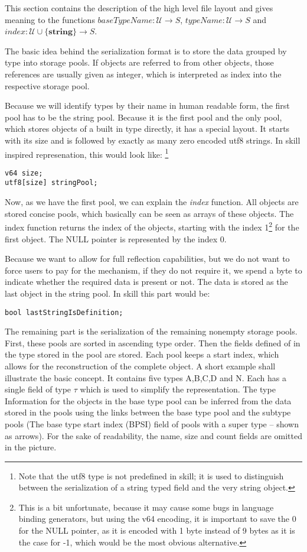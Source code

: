 \documentclass[a4paper,10pt]{article}
\begin{document}
This section contains the description of the high level file layout and gives meaning to the functions $baseTypeName: \mathcal{U} → S$, $typeName: \mathcal{U} → S$ and $index: \mathcal{U}\cup\{\textbf{string}\} → S$.

The basic idea behind the serialization format is to store the data grouped by type into storage pools. If objects are referred to from other objects, those references are usually given as integer, which is interpreted as index into the respective storage pool.

Because we will identify types by their name in human readable form, the first pool has to be the string pool. Because it is the first pool and the only pool, which stores objects of a built in type directly, it has a special layout. It starts with its size and is followed by exactly as many zero encoded utf8 strings. In skill inspired represenation, this would look like: \footnote{Note that the utf8 type is not predefined in skill; it is used to distinguish between the serialization of a string typed field and the very string object.}
\begin{verbatim}
v64 size;
utf8[size] stringPool;
\end{verbatim}

Now, as we have the first pool, we can explain the \textit{index} function. All objects are stored concise pools, which basically can be seen as arrays of these objects. The index function returns the index of the objects, starting with the index 1\footnote{This is a bit unfortunate, because it may cause some bugs in language binding generators, but using the v64 encoding, it is important to save the 0 for the NULL pointer, as it is encoded with 1 byte instead of 9 bytes as it is the case for -1, which would be the most obvious alternative.} for the first object. The NULL pointer is represented by the index 0.

Because we want to allow for full reflection capabilities, but we do not want to force users to pay for the mechanism, if they do not require it, we spend a byte to indicate whether the required data is present or not. The data is stored as the last object in the string pool. In skill this part would be:
\begin{verbatim}
bool lastStringIsDefinition;
\end{verbatim}

The remaining part is the serialization of the remaining nonempty storage pools. First, these pools are sorted in ascending type order. Then the fields defined of in the type stored in the pool are stored. Each pool keeps a start index, which allows for the reconstruction of the complete object. A short example shall illustrate the basic concept. It contains five types A,B,C,D and N. Each has a single field of type $\tau$ which is used to simplify the representation. The type Information for the objects in the base type pool can be inferred from the data stored in the pools using the links between the base type pool and the subtype pools (The base type start index (BPSI) field of pools with a super type -- shown as arrows). For the sake of readability, the name, size and count fields are omitted in the picture.
\end{document}
